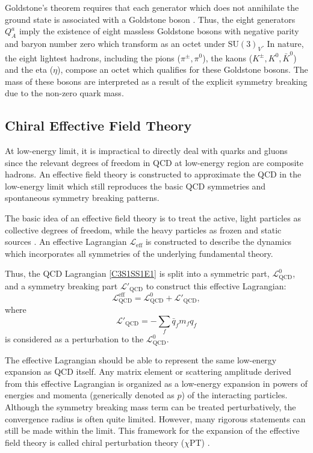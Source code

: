 Goldstone's theorem requires that each generator which does not annihilate the ground state is associated with a Goldstone boson \cite{Goldstone1961, Goldstone1962}. Thus, the eight generators $Q_A^a$ imply the existence of eight massless Goldstone bosons with negative parity and baryon number zero which transform as an octet under $\mathrm{SU}(3)_V$. In nature, the eight lightest hadrons, including the pions ($\pi^\pm, \pi^0$), the kaons ($K^\pm, K^0, \bar{K}^0$) and the eta ($\eta$), compose an octet which qualifies for these Goldstone bosons. The mass of these bosons are interpreted as a result of the explicit symmetry breaking due to the non-zero quark mass.

\subsection{Chiral Effective Field Theory}
\label{C3S1SS2}

At low-energy limit, it is impractical to directly deal with quarks and gluons since the relevant degrees of freedom in QCD at low-energy region are composite hadrons. An effective field theory is constructed to approximate the QCD in the low-energy limit which still reproduces the basic QCD symmetries and spontaneous symmetry breaking patterns.

The basic idea of an effective field theory is to treat the active, light particles as collective degrees of freedom, while the heavy particles as frozen and static sources \cite{Thomas2001}. An effective Lagrangian $\mathcal{L}_{\mathrm{eff}}$ is constructed to describe the dynamics which incorporates all symmetries of the underlying fundamental theory.

Thus, the QCD Lagrangian \cref{C3S1SS1E1} is split into a symmetric part, $\mathcal{L}_{\mathrm{QCD}}^0$, and a symmetry breaking part $\mathcal{L}'_{\mathrm{QCD}}$ to construct this effective Lagrangian:
\begin{equation} \label{C3S1SS2E1}
\mathcal{L}^{\mathrm{eff}}_{\mathrm{QCD}} = \mathcal{L}_{\mathrm{QCD}}^0+\mathcal{L}'_{\mathrm{QCD}},
\end{equation}
where
\begin{equation} \label{C3S1SS2E2}
\mathcal{L}'_{\mathrm{QCD}} = -\sum_f\bar{q}_fm_fq_f
\end{equation}
is considered as a perturbation to the $\mathcal{L}_{\mathrm{QCD}}^0$.

The effective Lagrangian should be able to represent the same low-energy expansion as QCD itself. Any matrix element or scattering amplitude derived from this effective Lagrangian is organized as a low-energy expansion in powers of energies and momenta (generically denoted as $p$) of the interacting particles. Although the symmetry breaking mass term can be treated perturbatively, the convergence radius is often quite limited. However, many rigorous statements can still be made within the limit. This framework for the expansion of the effective field theory is called chiral perturbation theory ($\chi$PT) \cite{Weinberg1979}.

